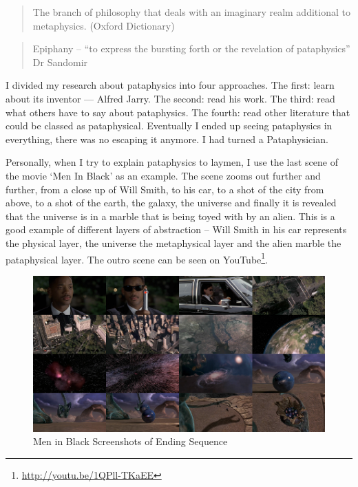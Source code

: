 \begin{quote}
  The branch of philosophy that deals with an imaginary realm additional to metaphysics. (Oxford Dictionary)
\end{quote}

\begin{quote}
  Epiphany – ``to express the bursting forth or the revelation of pataphysics'' Dr Sandomir \citep[p.174]{Hugill2012a}
\end{quote}

I divided my research about pataphysics into four approaches. The first: learn about its inventor --- Alfred Jarry. The second: read his work. The third: read what others have to say about pataphysics. The fourth: read other literature that could be classed as pataphysical. Eventually I ended up seeing pataphysics in everything, there was no escaping it anymore. I had turned a Pataphysician.

Personally, when I try to explain pataphysics to laymen, I use the last scene of the movie `Men In Black' as an example. The scene zooms out further and further, from a close up of Will Smith, to his car, to a shot of the city from above, to a shot of the earth, the galaxy, the universe and finally it is revealed that the universe is in a marble that is being toyed with by an alien. This is a good example of different layers of abstraction – Will Smith in his car represents the physical layer, the universe the metaphysical layer and the alien marble the pataphysical layer. The outro scene can be seen on YouTube\footnote{\url{http://youtu.be/1QPll-TKaEE}}.

\begin{figure}[htb] %
  \centering
  \includegraphics[width=\linewidth]{images/mib}
  \caption[Men in Black]{Men in Black Screenshots of Ending Sequence}
\label{fig:MIB}
\end{figure}

